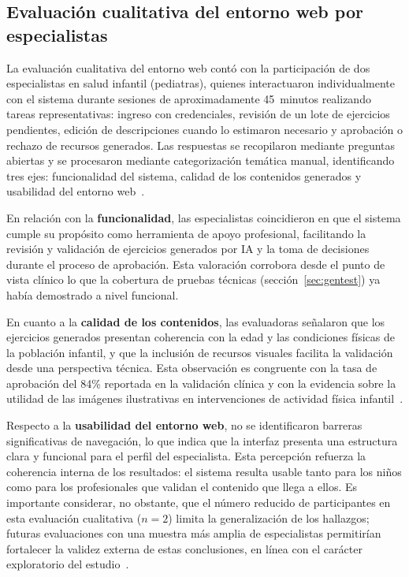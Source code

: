 			\subsection{Evaluación cualitativa del entorno web por especialistas}
			\label{sec:evalcualweb}
				La evaluación cualitativa del entorno web contó con la participación de dos especialistas en salud infantil (pediatras), quienes interactuaron individualmente con el sistema durante sesiones de aproximadamente 45~minutos realizando tareas representativas: ingreso con credenciales, revisión de un lote de ejercicios pendientes, edición de descripciones cuando lo estimaron necesario y aprobación o rechazo de recursos generados. Las respuestas se recopilaron mediante preguntas abiertas y se procesaron mediante categorización temática manual, identificando tres ejes: funcionalidad del sistema, calidad de los contenidos generados y usabilidad del entorno web~\cite{Nielsen1994}.
				
				En relación con la \textbf{funcionalidad}, las especialistas coincidieron en que el sistema cumple su propósito como herramienta de apoyo profesional, facilitando la revisión y validación de ejercicios generados por IA y la toma de decisiones durante el proceso de aprobación. Esta valoración corrobora desde el punto de vista clínico lo que la cobertura de pruebas técnicas (sección~\ref{sec:gentest}) ya había demostrado a nivel funcional.
				
				En cuanto a la \textbf{calidad de los contenidos}, las evaluadoras señalaron que los ejercicios generados presentan coherencia con la edad y las condiciones físicas de la población infantil, y que la inclusión de recursos visuales facilita la validación desde una perspectiva técnica. Esta observación es congruente con la tasa de aprobación del 84\% reportada en la validación clínica y con la evidencia sobre la utilidad de las imágenes ilustrativas en intervenciones de actividad física infantil~\cite{Hourcade2015}.
				
				Respecto a la \textbf{usabilidad del entorno web}, no se identificaron barreras significativas de navegación, lo que indica que la interfaz presenta una estructura clara y funcional para el perfil del especialista. Esta percepción refuerza la coherencia interna de los resultados: el sistema resulta usable tanto para los niños como para los profesionales que validan el contenido que llega a ellos. Es importante considerar, no obstante, que el número reducido de participantes en esta evaluación cualitativa ($n = 2$) limita la generalización de los hallazgos; futuras evaluaciones con una muestra más amplia de especialistas permitirían fortalecer la validez externa de estas conclusiones, en línea con el carácter exploratorio del estudio~\cite{GuerreroUlloa2024}.
				

